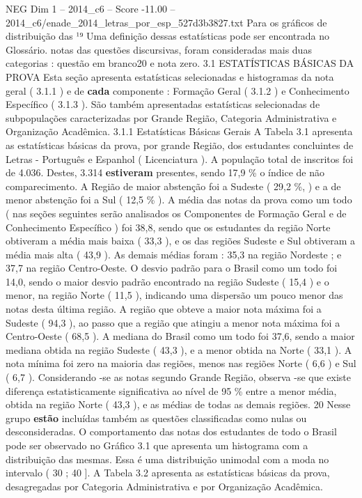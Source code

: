 \begin{textsample}{NEG Dim 1 – 2014\_c6 – Score -11.00 – 2014\_c6/enade\_2014\_letras\_por\_esp\_527d3b3827.txt}
Para os gráficos de distribuição das ¹⁹ Uma definição dessas estatísticas pode ser encontrada no Glossário. notas das questões discursivas, foram consideradas mais duas categorias : questão em branco20 e nota zero. 3.1 ESTATÍSTICAS BÁSICAS DA PROVA Esta seção apresenta estatísticas selecionadas e histogramas da nota geral ( 3.1.1 ) e de \textbf{cada} componente : Formação Geral ( 3.1.2 ) e Conhecimento Específico ( 3.1.3 ).
São também apresentadas estatísticas selecionadas de subpopulações caracterizadas por Grande Região, Categoria Administrativa e Organização Acadêmica. 3.1.1 Estatísticas Básicas Gerais A Tabela 3.1 apresenta as estatísticas básicas da prova, por grande Região, dos estudantes concluintes de Letras - Português e Espanhol ( Licenciatura ).
A população total de inscritos foi de 4.036.
Destes, 3.314 \textbf{estiveram} presentes, sendo 17,9 \% o índice de não comparecimento.
A Região de maior abstenção foi a Sudeste ( 29,2 \%, ) e a de menor abstenção foi a Sul ( 12,5 \% ).
A média das notas da prova como um todo ( nas seções seguintes serão analisados os Componentes de Formação Geral e de Conhecimento Específico ) foi 38,8, sendo que os estudantes da região Norte obtiveram a média mais baixa ( 33,3 ), e os das regiões Sudeste e Sul obtiveram a média mais alta ( 43,9 ).
As demais médias foram : 35,3 na região Nordeste ; e 37,7 na região Centro-Oeste.
O desvio padrão para o Brasil como um todo foi 14,0, sendo o maior desvio padrão encontrado na região Sudeste ( 15,4 ) e o menor, na região Norte ( 11,5 ), indicando uma dispersão um pouco menor das notas desta última região.
A região que obteve a maior nota máxima foi a Sudeste ( 94,3 ), ao passo que a região que atingiu a menor nota máxima foi a Centro-Oeste ( 68,5 ).
A mediana do Brasil como um todo foi 37,6, sendo a maior mediana obtida na região Sudeste ( 43,3 ), e a menor obtida na Norte ( 33,1 ).
A nota mínima foi zero na maioria das regiões, menos nas regiões Norte ( 6,6 ) e Sul ( 6,7 ).
Considerando -se as notas segundo Grande Região, observa -se que existe diferença estatisticamente significativa ao nível de 95 \% entre a menor média, obtida na região Norte ( 43,3 ), e as médias de todas as demais regiões. 20 Nesse grupo \textbf{estão} incluídas também as questões classificadas como nulas ou desconsideradas.
O comportamento das notas dos estudantes de todo o Brasil pode ser observado no Gráfico 3.1 que apresenta um histograma com a distribuição das mesmas.
Essa é uma distribuição unimodal com a moda no intervalo ( 30 ; 40 ].
A Tabela 3.2 apresenta as estatísticas básicas da prova, desagregadas por Categoria Administrativa e por Organização Acadêmica.

\end{textsample}
